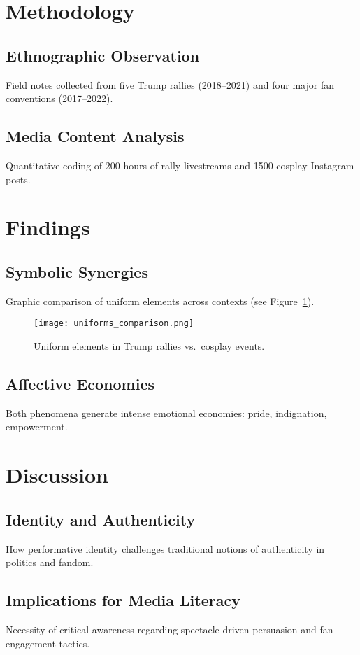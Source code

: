 \documentclass[11pt]{article}
\begin{document}
\clearpage
\section{Methodology}
\subsection{Ethnographic Observation}
Field notes collected from five Trump rallies (2018--2021) and four major fan conventions (2017--2022).

\subsection{Media Content Analysis}
Quantitative coding of 200 hours of rally livestreams and 1500 cosplay Instagram posts.

\section{Findings}
\subsection{Symbolic Synergies}
Graphic comparison of uniform elements across contexts (see Figure~\ref{fig:iconography}).

\begin{figure}[H]
  \centering
  \texttt{[image: uniforms\_comparison.png]}
  \caption{Uniform elements in Trump rallies vs.\ cosplay events.}
  \label{fig:iconography}
\end{figure}

\subsection{Affective Economies}
Both phenomena generate intense emotional economies: pride, indignation, empowerment.

\clearpage
\section{Discussion}
\subsection{Identity and Authenticity}
How performative identity challenges traditional notions of authenticity in politics and fandom.

\subsection{Implications for Media Literacy}
Necessity of critical awareness regarding spectacle-driven persuasion and fan engagement tactics.
\end{document}
